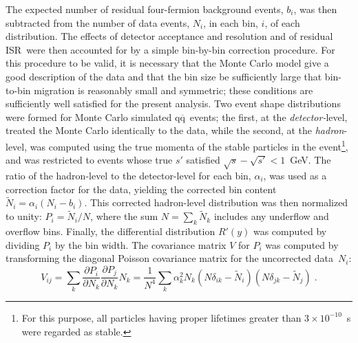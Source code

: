 \documentclass[12pt,a4paper,twoside]{article}
\newcommand{\qqbar}  {\ensuremath{\mathrm{q\overline{q}}}}
\newcommand{\isr}{\mbox{ISR}}
\begin{document}
The expected number of residual four-fermion background events, $b_i$,
was then subtracted from the number of data events, $N_i$, 
in each bin, $i$, of each distribution.  
The effects of detector acceptance and resolution and of residual \isr\ were then 
accounted for by a simple bin-by-bin correction procedure.
For this procedure to be valid, it is necessary that the Monte Carlo model 
give a good description of the data and that the bin size be sufficiently large that
bin-to-bin migration is reasonably small and symmetric; 
these conditions are 
sufficiently well satisfied for the present
analysis. 
Two event shape distributions were formed for Monte Carlo simulated \qqbar\ events;
the first, at the {\it detector-}level, treated the Monte Carlo identically to the data, 
while the second, at the {\it hadron}-level, was computed using the true momenta of
the stable particles
in the event\footnote{ For this purpose, all particles having proper lifetimes
greater than $3\times10^{-10}$~s were regarded as stable.}, 
and was restricted
to events whose true $s'$ satisfied $\sqrt{s}-\sqrt{s'}<1$~GeV. 
The ratio of the hadron-level to the detector-level for each bin, 
$\alpha_i$, was used as a correction factor for the data, yielding the corrected
bin content $\widetilde{N}_i=\alpha_i(N_i-b_i)$.  
This corrected hadron-level distribution was then normalized to unity:
$P_i=\widetilde{N}_i/N$, where the sum $N=\sum_k\widetilde{N}_k$ 
includes any
underflow and overflow bins. 
Finally, the differential distribution $R'(y)$ was computed by dividing
$P_i$ by the bin width.
The covariance matrix
$V$ for $P_i$ was computed by transforming the diagonal Poisson 
covariance matrix for the uncorrected data~$N_i$:
\begin{equation}
V_{ij} = \sum_k \frac{\partial P_i}{\partial N_k}
                \frac{\partial P_j}{\partial N_k} N_k
       = \frac{1}{N^4} \sum_k \alpha_k^2 N_k
         \left(N\delta_{ik} - \widetilde{N}_i\right)
         \left(N\delta_{jk} - \widetilde{N}_j\right) \;.
\end{equation}
\end{document}
